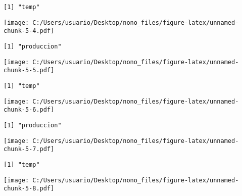 \documentclass[]{article}
\begin{document}
\begin{verbatim}
[1] "temp"
\end{verbatim}

\texttt{[image: C:/Users/usuario/Desktop/nono\_files/figure-latex/unnamed-chunk-5-4.pdf]}

\begin{verbatim}
[1] "produccion"
\end{verbatim}

\texttt{[image: C:/Users/usuario/Desktop/nono\_files/figure-latex/unnamed-chunk-5-5.pdf]}

\begin{verbatim}
[1] "temp"
\end{verbatim}

\texttt{[image: C:/Users/usuario/Desktop/nono\_files/figure-latex/unnamed-chunk-5-6.pdf]}

\begin{verbatim}
[1] "produccion"
\end{verbatim}

\texttt{[image: C:/Users/usuario/Desktop/nono\_files/figure-latex/unnamed-chunk-5-7.pdf]}

\begin{verbatim}
[1] "temp"
\end{verbatim}

\texttt{[image: C:/Users/usuario/Desktop/nono\_files/figure-latex/unnamed-chunk-5-8.pdf]}
\end{document}
